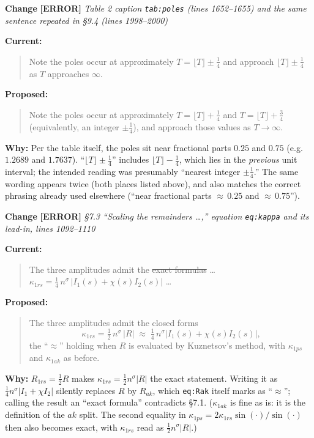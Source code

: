 \documentclass[11pt]{article}
\newcounter{chg}
\newcommand{\change}[3]{%
  \refstepcounter{chg}%
  \bigskip\par\noindent
  {\large\textbf{Change \thechg}}\quad
  {\color{#1}\textbf{[#2]}}\quad
  \textit{#3}\par\nobreak\smallskip}
\newenvironment{cur}{\par\noindent\textbf{Current:}\begin{quote}\color{delred}}{\end{quote}}
\newenvironment{prop}{\par\noindent\textbf{Proposed:}\begin{quote}\color{insblue}}{\end{quote}}
\newcommand{\why}[1]{\par\noindent\textbf{Why:} #1\par}
\begin{document}
\change{tagerr}{ERROR}{Table 2 caption \texttt{tab:poles} (lines 1652--1655)
and the same sentence repeated in \S{}9.4 (lines 1998--2000)}
\begin{cur}
Note the poles occur at approximately \sout{$T=\lfloor T\rfloor\pm\tfrac14$}
and approach \sout{$\lfloor T\rfloor\pm\tfrac14$} as $T$ approaches $\infty$.
\end{cur}
\begin{prop}
Note the poles occur at approximately $T=\lfloor T\rfloor+\tfrac14$ and
$T=\lfloor T\rfloor+\tfrac34$ (equivalently, an integer $\pm\tfrac14$), and
approach those values as $T\to\infty$.
\end{prop}
\why{Per the table itself, the poles sit near fractional parts $0.25$ and
$0.75$ (e.g.\ $1.2689$ and $1.7637$). ``$\lfloor T\rfloor\pm\tfrac14$''
includes $\lfloor T\rfloor-\tfrac14$, which lies in the \emph{previous} unit
interval; the intended reading was presumably ``nearest integer
$\pm\tfrac14$.'' The same wording appears twice (both places listed above), and
also matches the correct phrasing already used elsewhere (``near fractional
parts ${\approx}\,0.25$ and ${\approx}\,0.75$'').}

\change{tagerr}{ERROR}{\S{}7.3 ``Scaling the remainders \ldots,''
equation \texttt{eq:kappa} and its lead-in, lines 1092--1110}
\begin{cur}
The three amplitudes admit the \sout{exact formulas} \ldots{}
$\kappa_{1rs}=\tfrac14\,n^{\sigma}\,\bigl|I_1(s)+\chi(s)I_2(s)\bigr|$ \ldots
\end{cur}
\begin{prop}
The three amplitudes admit the closed forms
\[
\kappa_{1rs}=\tfrac12\,n^{\sigma}\,|R|
\;\approx\;\tfrac14\,n^{\sigma}\bigl|I_1(s)+\chi(s)I_2(s)\bigr|,
\]
the ``$\approx$'' holding when $R$ is evaluated by Kuznetsov's method, with
$\kappa_{1ps}$ and $\kappa_{1ak}$ as before.
\end{prop}
\why{$R_{1rs}=\tfrac12R$ makes $\kappa_{1rs}=\tfrac12n^{\sigma}|R|$ the exact
statement. Writing it as $\tfrac14n^{\sigma}|I_1+\chi I_2|$ silently replaces
$R$ by $R_{ak}$, which \texttt{eq:Rak} itself marks as ``$\approx$''; calling
the result an ``exact formula'' contradicts \S{}7.1. ($\kappa_{1ak}$ is fine as
is: it is the definition of the $ak$ split. The second equality in
$\kappa_{1ps}=2\kappa_{1rs}\sin(\cdot)/\sin(\cdot)$ then also becomes exact,
with $\kappa_{1rs}$ read as $\tfrac12n^{\sigma}|R|$.)}
\end{document}
